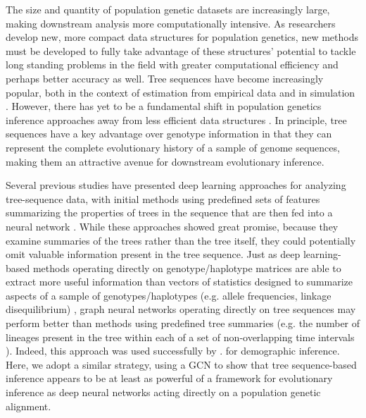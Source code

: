 The size and quantity of population genetic datasets are increasingly large, making downstream analysis more computationally intensive. As researchers develop new, more compact data structures for population genetics, new methods must be developed to fully take advantage of these structures' potential to tackle long standing problems in the field with greater computational efficiency and perhaps better accuracy as well. Tree sequences have become increasingly popular, both in the context of estimation from empirical data and in simulation \cite{hallerTreesequenceRecordingSLiM2019,kelleherEfficientPedigreeRecording2018,ralphEfficientlySummarizingRelationships2020}. However, there has yet to be a fundamental shift in population genetics inference approaches away from less efficient data structures \cite{korfmannDeepLearningPopulation2023a}. In principle, tree sequences have a key advantage over genotype information in that they can represent the complete evolutionary history of a sample of genome sequences, making them an attractive avenue for downstream evolutionary inference. 

Several previous studies have presented deep learning approaches for analyzing tree-sequence data, with initial methods using predefined sets of features summarizing the properties of trees in the sequence that are then fed into a neural network \cite{hejaseDeepLearningApproachInference2022,moDomainadaptiveNeuralNetworks2023a,pearsonLocalAncestryInference2023}. While these approaches showed great promise, because they examine summaries of the trees rather than the tree itself, they could potentially omit valuable information present in the tree sequence. Just as deep learning-based methods operating directly on genotype/haplotype matrices are able to extract more useful information than vectors of statistics designed to summarize aspects of a sample of genotypes/haplotypes (e.g. allele frequencies, linkage disequilibrium) \cite{flagelUnreasonableEffectivenessConvolutional2019,kernDiploSHICUpdated2018}, graph neural networks operating directly on tree sequences may perform better than methods using predefined tree summaries (e.g. the number of lineages present in the tree within each of a set of non-overlapping time intervals \cite{hejaseDeepLearningApproachInference2022}). Indeed, this approach was used successfully by \cite{korfmannSimultaneousInferenceDemography2023}. for demographic inference. Here, we adopt a similar strategy, using a GCN to show that tree sequence-based inference appears to be at least as powerful of a framework for evolutionary inference as deep neural networks acting directly on a population genetic alignment.

